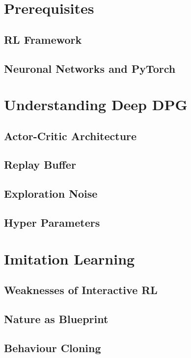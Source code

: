 \section{Prerequisites}
    \subsection{RL Framework}\label{chap:rlframework}
    
    \subsection{Neuronal Networks and PyTorch}
\section{Understanding Deep DPG}

    \subsection{Actor-Critic Architecture}
    
    \subsection{Replay Buffer}
    
    \subsection{Exploration Noise}
    
    \subsection{Hyper Parameters}
    
\section{Imitation Learning}
    
        \subsection{Weaknesses of Interactive RL}
         \label{subchap:weak}
        \subsection{Nature as Blueprint}
        
        \subsection{Behaviour Cloning}
        
